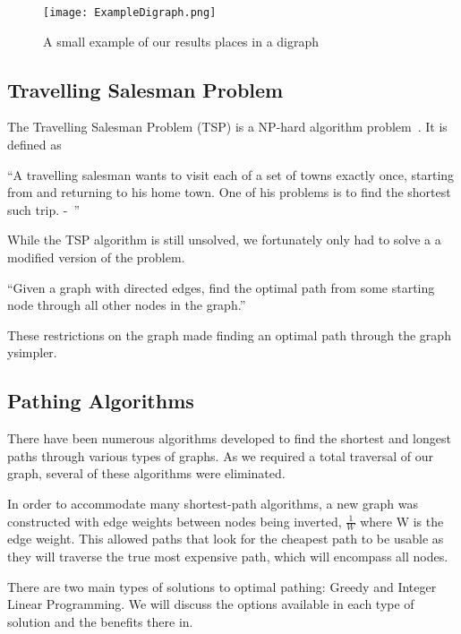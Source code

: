 \documentclass[bsc,frontabs,twoside,singlespacing,parskip,deptreport]{infthesis}     %
\begin{document}
\begin{figure}
  \centering
  \texttt{[image: ExampleDigraph.png]}
  \caption{A small example of our results places in a digraph}
  \label{fig:digraph}
 \end{figure}

\subsection{Travelling Salesman Problem}
The Travelling Salesman Problem (TSP) is a  NP-hard algorithm problem~\cite{junger1995traveling}.%
It is defined as
\begin{center}
\enquote{A travelling salesman wants to visit each of a set of towns exactly once, starting
from and returning to his home town. One of his problems is to find the shortest
such trip. -~\cite{junger1995traveling}}
\end{center}

While the TSP algorithm is still unsolved, we fortunately only had to solve a a modified version of the problem.\\

\begin{center}
  \enquote{Given a graph with directed edges, find the optimal path from some starting node through all other nodes in
  the graph.}
\end{center}

These restrictions on the graph made finding an optimal path through the graph ysimpler.


\subsection{Pathing Algorithms}
There have been numerous algorithms developed to find the shortest and longest paths through various types of graphs.
As we required a total traversal of our graph, several of these algorithms were eliminated.

In order to accommodate many shortest-path algorithms, a new graph was constructed with edge weights between nodes being inverted,
$\frac{1}{W}$ where W is the edge weight. This allowed paths that look for the cheapest path to be usable as they will traverse the
true most expensive path, which will encompass all nodes.

There are two main types of solutions to optimal pathing: Greedy and Integer Linear Programming.
We will discuss the options available in each type of solution and the benefits there in.
\end{document}
